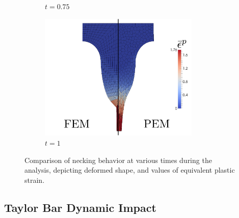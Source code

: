 \begin{figure}[!h]
\begin{subfigure}[b]{0.49\linewidth}
    			\caption{$t=0.75$ \label{fig:necking_eqps_2}}
    \end{subfigure}
	\begin{subfigure}[b]{0.49\linewidth}
            \centering
            \includegraphics[width=3.0in]{figures/necking_eqps_3.pdf}
    			\caption{$t=1$ \label{fig:necking_eqps_3}}
    \end{subfigure}
    \caption{Comparison of necking behavior at various times during the analysis, depicting deformed shape, and values of equivalent plastic strain.}
\end{figure}

\subsection*{Taylor Bar Dynamic Impact}

